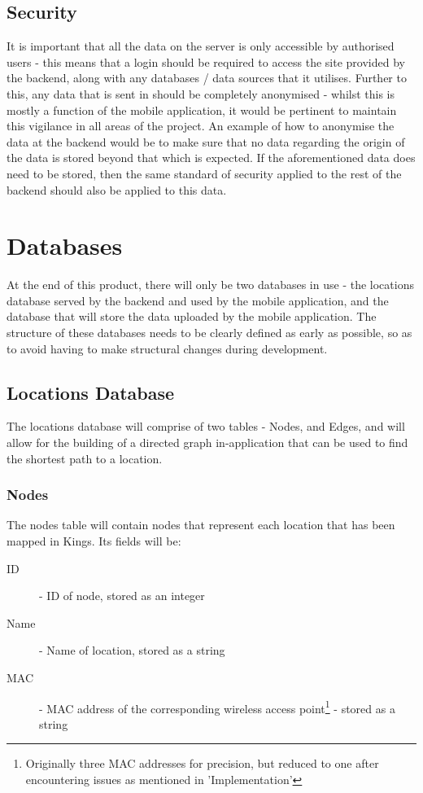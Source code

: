\documentclass[11pt]{informatics-report}
\begin{document}
\subsection{Security}

It is important that all the data on the server is only accessible by authorised users - this means that a login should be required to access the site provided by the backend, along with any databases / data sources that it utilises. Further to this, any data that is sent in should be completely anonymised - whilst this is mostly a function of the mobile application, it would be pertinent to maintain this vigilance in all areas of the project. An example of how to anonymise the data at the backend would be to make sure that no data regarding the origin of the data is stored beyond that which is expected. If the aforementioned data does need to be stored, then the same standard of security applied to the rest of the backend should also be applied to this data.


\section{Databases}

At the end of this product, there will only be two databases in use - the locations database served by the backend and used by the mobile application, and the database that will store the data uploaded by the mobile application. The structure of these databases needs to be clearly defined as early as possible, so as to avoid having to make structural changes during development. 

\subsection{Locations Database}

The locations database will comprise of two tables - Nodes, and Edges, and will allow for the building of a directed graph in-application that can be used to find the shortest path to a location.

\subsubsection{Nodes}

The nodes table will contain nodes that represent each location that has been mapped in Kings. Its fields will be: 

\begin{description}
\item[ID] - ID of node, stored as an integer
\item[Name] - Name of location, stored as a string
\item[MAC] - MAC address of the corresponding wireless access point\footnote{Originally three MAC addresses for precision, but reduced to one after encountering issues as mentioned in 'Implementation'} - stored as a string
\end{description}
\end{document}
